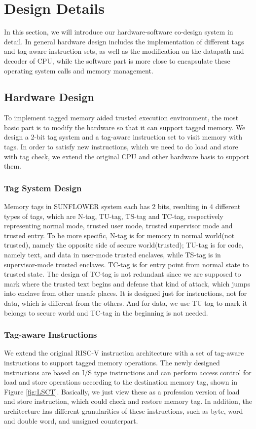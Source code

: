 \documentclass[conference]{IEEEtran}
\begin{document}
\section{Design Details}
In this section, we will introduce our hardware-software co-design system in detail. In general hardware design includes the implementation of different tags and tag-aware instruction sets, as well as the modification on the datapath and decoder of CPU, while the software part is more close to encapsulate these operating system calls and memory management. 

\subsection{Hardware Design}
To implement tagged memory aided trusted execution environment, the most basic part is to modify the hardware so that it can support tagged memory. We design a 2-bit tag system and a tag-aware instruction set to visit memory with tags. In order to satisfy new instructions, which we need to do load and store with tag check, we extend the original CPU and other hardware basis to support them. 

\subsubsection{Tag System Design}
Memory tags in SUNFLOWER system each has 2 bits, resulting in 4 different types of tags, which are N-tag, TU-tag, TS-tag and TC-tag, respectively representing normal mode, trusted user mode, trusted supervisor mode and trusted entry. To be more specific, N-tag is for memory in normal world(not trusted), namely the opposite side of secure world(trusted); TU-tag is for code, namely text, and data in user-mode trusted enclaves, while TS-tag is in supervisor-mode trusted enclaves. TC-tag is for entry point from normal state to trusted state. The design of TC-tag is not redundant since we are supposed to mark where the trusted text begins and defense that kind of attack, which jumps into enclave from other unsafe places. It is designed just for instructions, not for data, which is different from the others. And for data, we use TU-tag to mark it belongs to secure world and TC-tag in the beginning is not needed.

\subsubsection{Tag-aware Instructions}
We extend the original RISC-V instruction architecture with a set of tag-aware instructions to support tagged memory operations. The newly designed instructions are based on I/S type instructions and can perform access control for load and store operations according to the destination memory tag, shown in Figure \ref{fig:LSCT}. Basically, we just view these as a profession version of load and store instruction, which could check and restore memory tag. In addition, the architecture has different granularities of these instructions, such as byte, word and double word, and unsigned counterpart.
\end{document}
